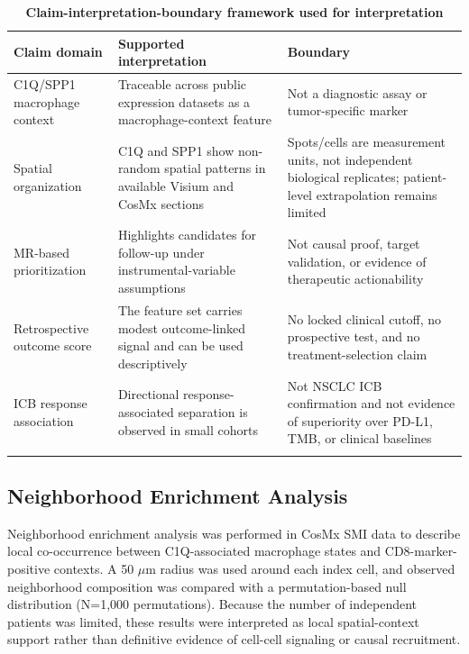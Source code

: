 \documentclass[pdflatex,sn-mathphys-num,referee,lineno]{sn-jnl}
\theoremstyle{thmstyleone}%
\theoremstyle{thmstyletwo}%
\theoremstyle{thmstylethree}%
\begin{document}
\begin{table}[htbp]
    \caption{\textbf{Claim-interpretation-boundary framework used for interpretation}}\label{tab:evidence_boundary}
    \small
    \setlength{\tabcolsep}{4pt}
    \begin{tabularx}{\textwidth}{>{\raggedright\arraybackslash}p{}>{\raggedright\arraybackslash}X>{\raggedright\arraybackslash}X}
        \toprule
        Claim domain & Supported interpretation & Boundary \\
        \midrule
        C1Q/SPP1 macrophage context & Traceable across public expression datasets as a macrophage-context feature & Not a diagnostic assay or tumor-specific marker \\
        Spatial organization & C1Q and SPP1 show non-random spatial patterns in available Visium and CosMx sections & Spots/cells are measurement units, not independent biological replicates; patient-level extrapolation remains limited \\
        MR-based prioritization & Highlights candidates for follow-up under instrumental-variable assumptions & Not causal proof, target validation, or evidence of therapeutic actionability \\
        Retrospective outcome score & The feature set carries modest outcome-linked signal and can be used descriptively & No locked clinical cutoff, no prospective test, and no treatment-selection claim \\
        ICB response association & Directional response-associated separation is observed in small cohorts & Not NSCLC ICB confirmation and not evidence of superiority over PD-L1, TMB, or clinical baselines \\
        \botrule
    \end{tabularx}
\end{table}

\subsection{Neighborhood Enrichment Analysis}\label{subsec:neighborhood}

Neighborhood enrichment analysis was performed in CosMx SMI data to describe local co-occurrence between C1Q-associated macrophage states and CD8-marker-positive contexts. A 50 $\mu$m radius was used around each index cell, and observed neighborhood composition was compared with a permutation-based null distribution (N=1,000 permutations). Because the number of independent patients was limited, these results were interpreted as local spatial-context support rather than definitive evidence of cell-cell signaling or causal recruitment.
\end{document}
